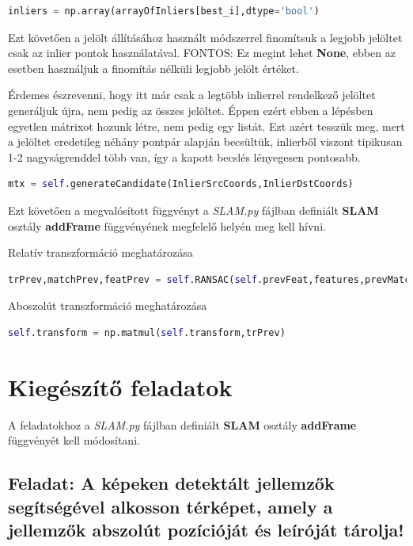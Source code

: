 \documentclass[12pt,a4paper,oneside]{report}             %
\begin{document}
\begin{lstlisting}[language=Python]
inliers = np.array(arrayOfInliers[best_i],dtype='bool')
\end{lstlisting}

Ezt követően a jelölt állításához használt módszerrel finomítsuk a legjobb jelöltet csak az inlier pontok használatával. FONTOS: Ez megint lehet \textbf{None}, ebben az esetben használjuk a finomítás nélküli legjobb jelölt értéket.

Érdemes észrevenni, hogy itt már csak a legtöbb inlierrel rendelkező jelöltet generáljuk újra, nem pedig az összes jelöltet. Éppen ezért ebben a lépésben egyetlen mátrixot hozunk létre, nem pedig egy listát. Ezt azért tesszük meg, mert a jelöltet eredetileg néhány pontpár alapján becsültük, inlierből viszont tipikusan 1-2 nagyságrenddel több van, így a kapott becslés lényegesen pontosabb.

\begin{lstlisting}[language=Python]
mtx = self.generateCandidate(InlierSrcCoords,InlierDstCoords)
\end{lstlisting}

Ezt követően a megvalósított függvényt a \emph{SLAM.py} fájlban definiált \textbf{SLAM} osztály \textbf{addFrame} függvényének megfelelő helyén meg kell hívni.

Relatív transzformáció meghatározása

\begin{lstlisting}[language=Python]
trPrev,matchPrev,featPrev = self.RANSAC(self.prevFeat,features,prevMatch)
\end{lstlisting}

Aboszolút transzformáció meghatározása

\begin{lstlisting}[language=Python]
self.transform = np.matmul(self.transform,trPrev)
\end{lstlisting}

\section{Kiegészítő feladatok}

A feladatokhoz a \emph{SLAM.py} fájlban definiált \textbf{SLAM} osztály \textbf{addFrame} függvényét kell módosítani.

\subsection{Feladat: A képeken detektált jellemzők segítségével alkosson térképet, amely a jellemzők abszolút pozícióját és leíróját tárolja!}
\end{document}
